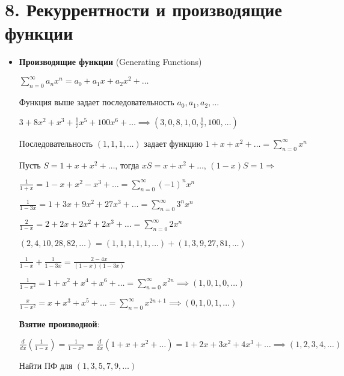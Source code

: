 \documentclass[12pt]{article}
\begin{document}
    \clearpage


    \section{8. Рекуррентности и производящие функции}

    \begin{itemize}
        \item \textbf{Производящие функции} (Generating Functions)

        $\sum_{n = 0}^\infty a_n x^n = a_0 + a_1 x + a_2 x^2 + \dots$

        Функция выше задает последовательность $a_0, a_1, a_2, \dots$

        \Ex $3 + 8x^2 + x^3 + \frac{1}{7}x^5 + 100x^6 + \dots \implies (3, 0, 8, 1, 0, \frac{1}{7}, 100, \dots)$

        \Ex Последовательность $(1, 1, 1, \dots)$ задает функцию $1 + x + x^2 + \dots = \sum_{n = 0}^\infty x^n$

        Пусть $S = 1 + x + x^2 + \dots$, тогда $xS = x + x^2 + \dots$, $(1 - x) S = 1 \Longrightarrow $


        \Ex

        $\frac{1}{1 + x} = 1 - x + x^2 - x^3 + \dots = \sum_{n = 0}^\infty (-1)^n x^n$

        $\frac{1}{1 - 3x} = 1 + 3x + 9x^2 + 27x^3 + \dots = \sum_{n = 0}^\infty 3^n x^n$

        $\frac{2}{1 - x} = 2 + 2x + 2x^2 + 2x^3 + \dots = \sum_{n = 0}^\infty 2 x^n$

        $(2, 4, 10, 28, 82, \dots) = (1, 1, 1, 1, 1, \dots) + (1, 3, 9, 27, 81, \dots)$

        $\frac{1}{1 - x} + \frac{1}{1 - 3x} = \frac{2 - 4x}{(1 - x)(1 - 3x)}$

        $\frac{1}{1 - x^2} = 1 + x^2 + x^4 + x^6 + \dots = \sum_{n = 0}^\infty x^{2n} \implies (1, 0, 1, 0, \dots)$

        $\frac{x}{1 - x^2} = x + x^3 + x^5 + \dots = \sum_{n = 0}^\infty x^{2n + 1} \implies (0, 1, 0, 1, \dots)$

        \textbf{Взятие производной}:

        $\frac{d}{dx} (\frac{1}{1 - x}) = \frac{1}{1 - x^2} = \frac{d}{dx} (1 + x + x^2 + \dots) = 1 + 2x + 3x^2 + 4x^3 + \dots \implies (1, 2, 3, 4, \dots)$

        \Ex Найти ПФ для $(1, 3, 5, 7, 9, \dots)$


\end{itemize}
\end{document}
